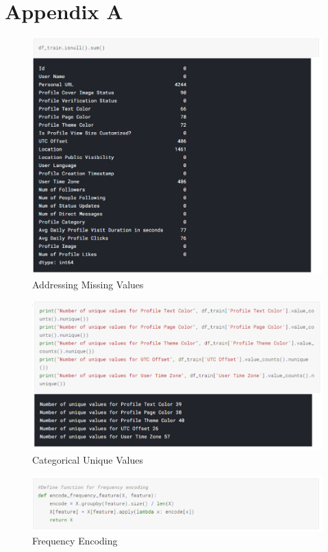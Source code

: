 \documentclass[sigplan,screen]{acmart}
\begin{document}
\section{Appendix A}
\begin{figure}[H]
\centering
\includegraphics[width=\columnwidth]{Picture1.png}
\caption{Addressing Missing Values}\label{addressing_missing_values}
\end{figure}
\begin{figure}[H]
\centering
\includegraphics[width=\columnwidth]{Unique values.png}
\caption{Categorical Unique Values}\label{unique_values}
\end{figure}

\begin{figure}[H]
\centering
\includegraphics[width=\columnwidth]{Freq enc.png}
\caption{Frequency Encoding}\label{frequency_encoding}
\end{figure}
\end{document}

